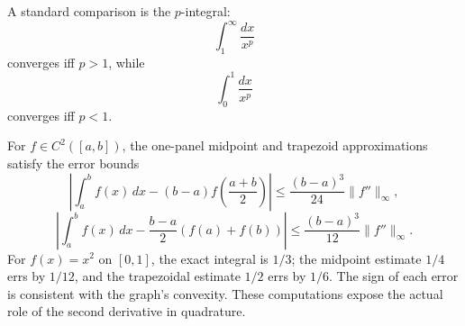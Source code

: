 A standard comparison is the $p$-integral:
\[
  \int_1^\infty 
\frac{dx}{x^p}
\]
converges iff $p>1$, while
\[
  \int_0^1 
\frac{dx}{x^p}
\]
converges iff $p<1$.

For \(f\in C^2([a,b])\), the one-panel midpoint and trapezoid approximations satisfy the error bounds
\[
 \left|\int_a^b f(x)\,dx-(b-a)f\left(\frac{a+b}2\right)\right|
 \le\frac{(b-a)^3}{24}\|f''\|_\infty,
\]
\[
 \left|\int_a^b f(x)\,dx-\frac{b-a}2(f(a)+f(b))\right|
 \le\frac{(b-a)^3}{12}\|f''\|_\infty.
\]
For \(f(x)=x^2\) on \([0,1]\), the exact integral is \(1/3\); the midpoint estimate \(1/4\) errs by \(1/12\), and the trapezoidal estimate \(1/2\) errs by \(1/6\). The sign of each error is consistent with the graph's convexity. These computations expose the actual role of the second derivative in quadrature.
